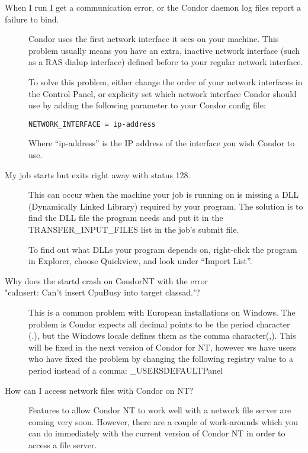 \begin{description}
\item[When I run  I get a communication error, or the Condor daemon log files report a failure to bind.]

Condor uses the first network interface it sees on your machine.
This problem usually means you have an extra, inactive network
interface (such as a RAS dialup interface) defined before to your
regular network interface.

To solve this problem, either change the order of your network
interfaces in the Control Panel, or explicity set which network
interface Condor should use by adding the following parameter to your
Condor config file:

\begin{verbatim}NETWORK_INTERFACE = ip-address\end{verbatim}

Where ``ip-address'' is the IP address of the interface you wish
Condor to use.

\item[My job starts but exits right away with status 128.]

This can occur when the machine your job is running on is missing a
DLL (Dynamically Linked Library) required by your program.
The solution is to find the DLL file the program needs and put it in
the TRANSFER\_INPUT\_FILES list in the job's submit file.

To find out what DLLs your program depends on, right-click the program
in Explorer, choose Quickview, and look under ``Import List''.


\item[Why does the startd crash on CondorNT with the error\\
"caInsert: Can't insert CpuBusy into target classad."?]

This is a common problem with European installations on Windows.
The problem is Condor expects all decimal points to be the
period character (.),
but the Windows locale defines them as the comma character(,).
This will be fixed in the next version of Condor for NT,
however we have users who have fixed the problem by 
changing the following registry value to a period instead of a comma:
\verb@HKEY_USERS\.DEFAULT\Control Panel\International\sDecimal@

\item[How can I access network files with Condor on NT?]

Features to allow Condor NT to work well with a network file server are 
coming very soon.  However, there are a couple of work-arounds which you 
can do immediately with the current version of Condor NT in order to access 
a file server.


\end{description}

